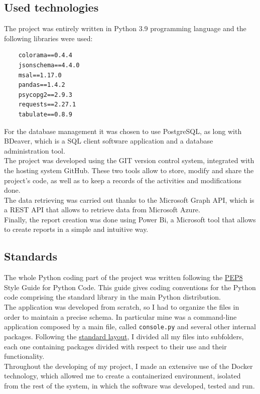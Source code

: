 \documentclass[12pt, a4paper, oneside]{article}
\begin{document}
\subsection{Used technologies}
The project was entirely written in Python 3.9 programming language and the following libraries were used:
\begin{verbatim}
    colorama==0.4.4
    jsonschema==4.4.0
    msal==1.17.0
    pandas==1.4.2   
    psycopg2==2.9.3
    requests==2.27.1
    tabulate==0.8.9
\end{verbatim}
For the database management it was chosen to use PostgreSQL, as long with BDeaver, which is a SQL client software application and a database administration tool.\\
The project was developed using the GIT version control system, integrated with the hosting system GitHub. These two tools allow to store, modify and share the project's code, as well as to keep a records
of the activities and modifications done.\\
The data retrieving was carried out thanks to the Microsoft Graph API, which is a REST API that allows to retrieve data from Microsoft Azure.\\
Finally, the report creation was done using Power Bi, a Microsoft tool that allows to create reports in a simple and intuitive way.

\newpage
\subsection{Standards}
The whole Python coding part of the project was written following the \href{https://peps.python.org/pep-0008/}{PEP8} Style Guide for Python Code.
This guide gives coding conventions for the Python code comprising the standard library in the main Python distribution.\\
The application was developed from scratch, so I had to organize the files in order to maintain a precise schema. In particular mine was a command-line application composed by a main file, called \texttt{console.py}
and several other internal packages. Following the \href{https://docs.python-guide.org/writing/structure/}{standard layout}, I divided all my files into subfolders, each one containing packages divided with
respect to their use and their functionality.\\
Throughout the developing of my project, I made an extensive use of the Docker technology, which allowed me to create a containerized environment, isolated from the rest of the system,
in which the software was developed, tested and run.
\end{document}
